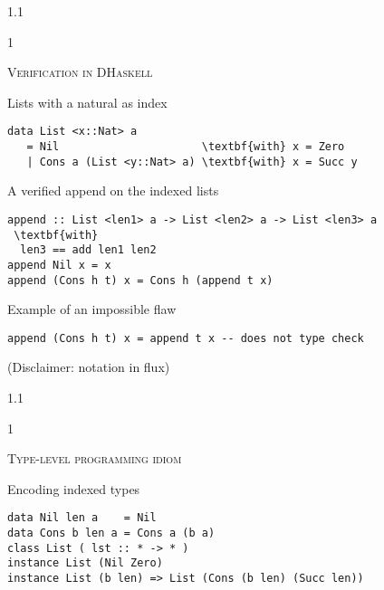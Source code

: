 \documentclass{slides}
\newcommand{\header}[1]{{\large\scshape \color{Red} #1} \medskip }
\newcommand{\blau}[1]{{\color{Blue} #1} \medskip }
\newenvironment{myslide}{\begin{slide}\color{Blue}\begin{boxedminipage}{1.1\hsize}\begin{boxedminipage}{1\hsize}\color{Black}
\vspace{-170\in}
}{%
\smallskip
\end{boxedminipage}
\end{boxedminipage}
\end{slide}}
\begin{document}



\begin{myslide}

\header{Verification in DHaskell}

\blau{Lists with a natural as index}

\begin{Verbatim}[fontseries=normal,fontsize=\tiny,commandchars=\\\{\}]
data List <x::Nat> a
   = Nil                      \textbf{with} x = Zero
   | Cons a (List <y::Nat> a) \textbf{with} x = Succ y
\end{Verbatim}

\blau{A verified append on the indexed lists}

\begin{Verbatim}[fontseries=normal,fontsize=\tiny,commandchars=\\\{\}]
append :: List <len1> a -> List <len2> a -> List <len3> a
 \textbf{with} 
  len3 == add len1 len2
append Nil x = x
append (Cons h t) x = Cons h (append t x)
\end{Verbatim}

\blau{Example of an impossible flaw}

\begin{Verbatim}[fontseries=normal,fontsize=\tiny,commandchars=\\\{\}]
append (Cons h t) x = append t x -- does not type check
\end{Verbatim}

\medskip

(Disclaimer: notation in flux)

\end{myslide}






\begin{myslide}

\header{Type-level programming idiom}

\blau{Encoding indexed types}

\medskip

\begin{Verbatim}[fontseries=normal,fontsize=\tiny]
data Nil len a    = Nil
data Cons b len a = Cons a (b a)
class List ( lst :: * -> * )
instance List (Nil Zero)
instance List (b len) => List (Cons (b len) (Succ len))
\end{Verbatim}

\end{myslide}
\end{document}
